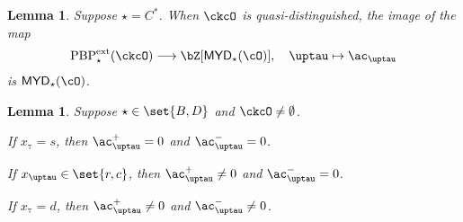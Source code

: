 \documentclass[12pt,a4paper]{amsart}
\def\MYD{{\mathsf{MYD}}}
\numberwithin{equation}{section}
\newtheorem{lem}[thm]{Lemma}
\theoremstyle{remark}
\def\PBPes{\mathrm{PBP}^{\mathrm{ext}}_{\star}}
\begin{document}
\begin{lem}\label{lem:C*}
Suppose $\star = C^{*}$.
  When $\ckcO$ is quasi-distinguished, the image of the map
    \[
      \PBPes( \ckcO )\longrightarrow \bZ[\MYD_{\star}(\cO)],
      \quad \uptau\mapsto \ac_{\uptau}
    \]
    is $\MYD_{\star}(\cO)$.
\end{lem}

\begin{lem}\label{lem:BD2}
Suppose $\star \in \set{B,D}$ and $\ckcO \neq \emptyset$.
\begin{enuma}
  \item If $x_{\uptau}=s$, then $\ac_{\uptau}^{+} =0$ and $\ac_{\uptau}^{-}=0$.
  \item If $x_{\uptau}\in \set{r,c}$, then $\ac_{\uptau}^{+} \neq 0$ and $\ac_{\uptau}^{-}=0$.
  \item If $x_{\uptau}=d$, then $\ac_{\uptau}^{+} \neq 0$ and
  $\ac_{\uptau}^{-}\neq 0$.
\end{enuma}
\end{lem}
\end{document}
